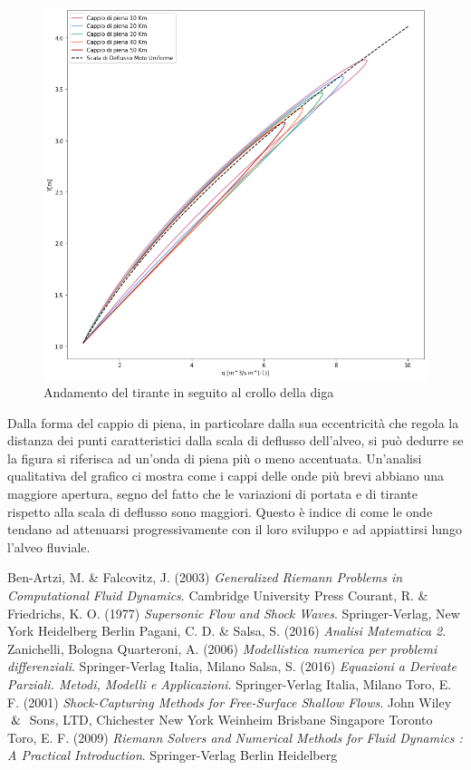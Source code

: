 \documentclass[12pt]{article} %
\begin{document}
\begin{figure} [H]
    \centering
    \includegraphics[scale=0.5,width=18cm]{Cappio.png}
    \caption{Andamento del tirante in seguito al crollo della diga}
    \label{fig:cappio}
\end{figure}

\noindent Dalla forma del cappio di piena, in particolare dalla sua eccentricità che regola la distanza dei punti caratteristici dalla scala di deflusso dell'alveo, si può dedurre se la figura si riferisca ad un'onda di piena più o meno accentuata.
Un'analisi qualitativa del grafico ci mostra come i cappi delle onde più brevi abbiano una maggiore apertura, segno del fatto che le variazioni di portata e di tirante rispetto alla scala di deflusso sono maggiori. Questo è indice di come le onde tendano ad attenuarsi progressivamente con il loro sviluppo e ad appiattirsi lungo l'alveo fluviale.

\newpage
\begin{thebibliography}{}
Ben-Artzi, M. \& Falcovitz, J. (2003) \textit{Generalized Riemann Problems in Computational Fluid Dynamics}. Cambridge University Press
Courant, R. \& Friedrichs, K. O. (1977) \textit{Supersonic Flow and Shock Waves}. Springer-Verlag, New York Heidelberg Berlin
Pagani, C. D. \& Salsa, S. (2016) \textit{Analisi Matematica 2}. Zanichelli, Bologna
Quarteroni, A. (2006) \textit{Modellistica numerica per problemi differenziali}. Springer-Verlag Italia, Milano
Salsa, S. (2016) \textit{Equazioni a Derivate Parziali. Metodi, Modelli e Applicazioni}. Springer-Verlag Italia, Milano
Toro, E. F. (2001) \textit{Shock-Capturing Methods for Free-Surface Shallow Flows}. John Wiley $\And$ Sons, LTD, Chichester New York Weinheim Brisbane Singapore Toronto
Toro, E. F. (2009) \textit{Riemann Solvers and Numerical Methods for Fluid Dynamics : A Practical Introduction}. Springer-Verlag Berlin Heidelberg 
\end{thebibliography}
\end{document}
